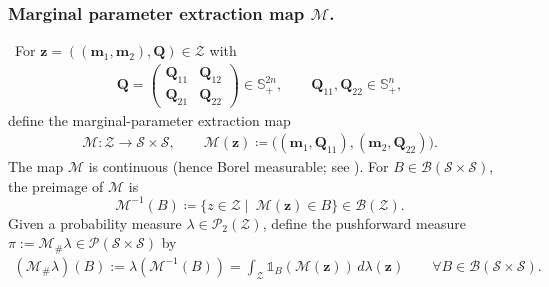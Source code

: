 \documentclass[opre,sglanonrev]{informs4}
\newcommand{\mZ}{\mathcal{Z}}
\newcommand{\mS}{\mathcal{S}}
\newcommand{\mM}{\mathcal{M}}
\newcommand{\mP}{\mathcal{P}}
\newcommand{\mB}{\mathcal{B}}
\newcommand{\mbS}{\mathbb S}
\newcommand{\ind}{\mathds{1}}
\newcommand{\bmean}{\bm{m}}
\newcommand{\bz}{\bm{z}}
\newcommand{\bQ}{\bm Q}
\begin{document}
\subsubsection{\texorpdfstring{Marginal parameter extraction map $\mM$. }{Marginal parameter extraction map}}\,
For $\bz=((\bmean_1,\bmean_2),\bQ)\in\mZ$ with
\begin{align}\label{def: Q-block}
\bQ=\begin{pmatrix}\bQ_{11}&\bQ_{12}\\ \bQ_{21}&\bQ_{22}\end{pmatrix}\in\mbS^{2n}_+,
\qquad \bQ_{11},\bQ_{22}\in\mbS^n_+, 
\end{align} define the marginal-parameter extraction map
\begin{align}\label{def: OT-map-backward}
\mM:\mZ\to \mS\times\mS,\qquad
\mM(\bz) \coloneqq \bigl((\bmean_1,\bQ_{11}),(\bmean_2,\bQ_{22})\bigr). 
\end{align}
The map $\mM$ is continuous (hence Borel measurable; see \cite[Theorem 1.6]{folland1999real}). For $B\in\mB(\mS\times\mS)$, the preimage of $\mM$ is
\vspace{-2.0em}
\[
\mM^{-1}(B)\coloneqq \{z\in\mZ \mid\ \mM(\bz)\in B\}\in\mB(\mZ).
\]
Given a probability measure $\lambda \in \mP_2(\mZ)$, define the pushforward measure
$\pi := \mM_\#\lambda \in \mP(\mS\times\mS)$ by
\begin{align*}
(\mM_\#\lambda)(B)
:=\lambda(\mM^{-1}(B))
=\int_{\mZ}\ind_{B}(\mM(\bz))\,d\lambda(\bz)
\qquad \forall B\in\mB(\mS\times\mS).
\end{align*}
\end{document}
